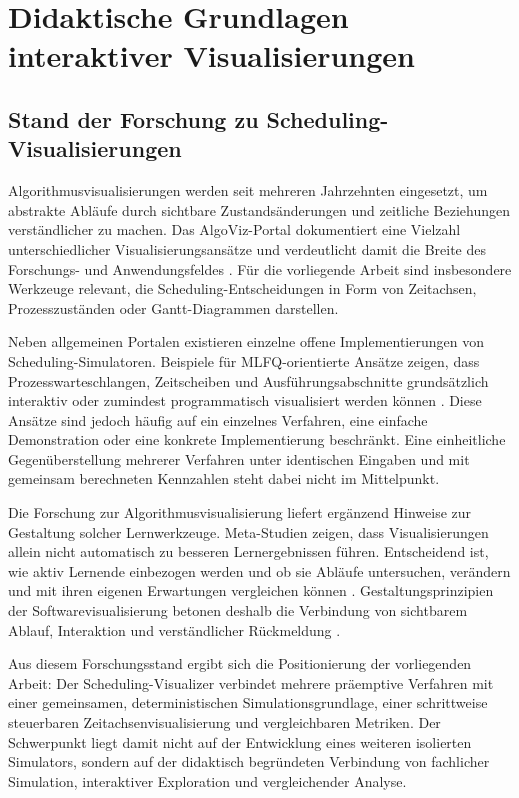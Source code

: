 \chapter{Didaktische Grundlagen interaktiver Visualisierungen}

\section{Stand der Forschung zu Scheduling-Visualisierungen}

Algorithmusvisualisierungen werden seit mehreren Jahrzehnten eingesetzt, um abstrakte Abläufe durch sichtbare Zustandsänderungen und zeitliche Beziehungen verständlicher zu machen. Das AlgoViz-Portal dokumentiert eine Vielzahl unterschiedlicher Visualisierungsansätze und verdeutlicht damit die Breite des Forschungs- und Anwendungsfeldes \cite{algoviz}. Für die vorliegende Arbeit sind insbesondere Werkzeuge relevant, die Scheduling-Entscheidungen in Form von Zeitachsen, Prozesszuständen oder Gantt-Diagrammen darstellen.

Neben allgemeinen Portalen existieren einzelne offene Implementierungen von Scheduling-Simulatoren. Beispiele für MLFQ-orientierte Ansätze zeigen, dass Prozesswarteschlangen, Zeitscheiben und Ausführungsabschnitte grundsätzlich interaktiv oder zumindest programmatisch visualisiert werden können \cite{sibtain2023mlfq,mlfqvisualizer_repo}. Diese Ansätze sind jedoch häufig auf ein einzelnes Verfahren, eine einfache Demonstration oder eine konkrete Implementierung beschränkt. Eine einheitliche Gegenüberstellung mehrerer Verfahren unter identischen Eingaben und mit gemeinsam berechneten Kennzahlen steht dabei nicht im Mittelpunkt.

Die Forschung zur Algorithmusvisualisierung liefert ergänzend Hinweise zur Gestaltung solcher Lernwerkzeuge. Meta-Studien zeigen, dass Visualisierungen allein nicht automatisch zu besseren Lernergebnissen führen. Entscheidend ist, wie aktiv Lernende einbezogen werden und ob sie Abläufe untersuchen, verändern und mit ihren eigenen Erwartungen vergleichen können \cite{hundhausen2002meta,naps2002engagement}. Gestaltungsprinzipien der Softwarevisualisierung betonen deshalb die Verbindung von sichtbarem Ablauf, Interaktion und verständlicher Rückmeldung \cite{stasko1998software}.

Aus diesem Forschungsstand ergibt sich die Positionierung der vorliegenden Arbeit: Der Scheduling-Visualizer verbindet mehrere präemptive Verfahren mit einer gemeinsamen, deterministischen Simulationsgrundlage, einer schrittweise steuerbaren Zeitachsenvisualisierung und vergleichbaren Metriken. Der Schwerpunkt liegt damit nicht auf der Entwicklung eines weiteren isolierten Simulators, sondern auf der didaktisch begründeten Verbindung von fachlicher Simulation, interaktiver Exploration und vergleichender Analyse.

